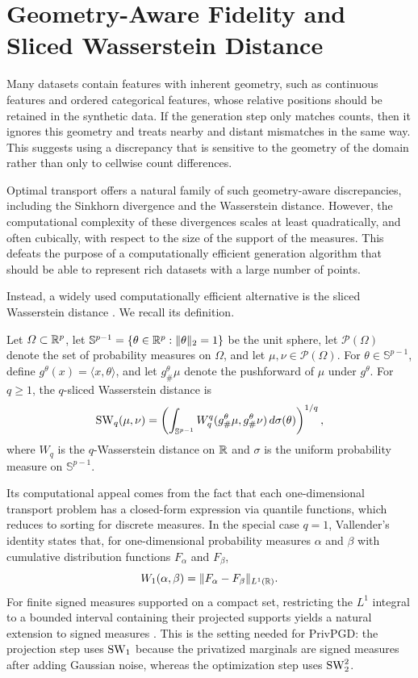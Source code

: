 \section{Geometry-Aware Fidelity and Sliced Wasserstein Distance}

Many datasets contain features with inherent geometry, such as continuous features and ordered categorical features, whose relative positions should be retained in the synthetic data. If the generation step only matches counts, then it ignores this geometry and treats nearby and distant mismatches in the same way. This suggests using a discrepancy that is sensitive to the geometry of the domain rather than only to cellwise count differences.

Optimal transport offers a natural family of such geometry-aware discrepancies, including the Sinkhorn divergence and the Wasserstein distance. However, the computational complexity of these divergences scales at least quadratically, and often cubically, with respect to the size of the support of the measures. This defeats the purpose of a computationally efficient generation algorithm that should be able to represent rich datasets with a large number of points.

Instead, a widely used computationally efficient alternative is the sliced Wasserstein distance \citep{bonneel2015sliced,wu2019sliced,kolouri2018sliced,deshpande2018generative,deshpande2019max}. We recall its definition.

\begin{definition}
Let \(\Omega \subset \mathbb{R}^p\), let \(\mathbb{S}^{p-1} = \{\theta \in \mathbb{R}^p : \|\theta\|_2 = 1\}\) be the unit sphere, let \(\mathcal{P}(\Omega)\) denote the set of probability measures on \(\Omega\), and let \(\mu,\nu \in \mathcal{P}(\Omega)\). For \(\theta \in \mathbb{S}^{p-1}\), define \(g^\theta(x)=\langle x,\theta\rangle\), and let \(g^\theta_{\#}\mu\) denote the pushforward of \(\mu\) under \(g^\theta\). For \(q \geq 1\), the \(q\)-sliced Wasserstein distance is
\[
  \operatorname{SW}_q(\mu,\nu)
  =
  \left(
    \int_{\mathbb{S}^{p-1}}
    W_q^q(g^\theta_{\#}\mu,g^\theta_{\#}\nu)\,d\sigma(\theta)
  \right)^{1/q},
\]
where \(W_q\) is the \(q\)-Wasserstein distance on \(\mathbb{R}\) and \(\sigma\) is the uniform probability measure on \(\mathbb{S}^{p-1}\).
\end{definition}

Its computational appeal comes from the fact that each one-dimensional transport problem has a closed-form expression via quantile functions, which reduces to sorting for discrete measures. In the special case \(q=1\), Vallender's identity states that, for one-dimensional probability measures \(\alpha\) and \(\beta\) with cumulative distribution functions \(F_\alpha\) and \(F_\beta\),
\[
  W_1(\alpha,\beta) = \|F_\alpha - F_\beta\|_{L^1(\mathbb{R})}.
\]
For finite signed measures supported on a compact set, restricting the \(L^1\) integral to a bounded interval containing their projected supports yields a natural extension to signed measures \citep{vallander,boedihardjo2022private}. This is the setting needed for PrivPGD: the projection step uses \(\operatorname{SW}_1\) because the privatized marginals are signed measures after adding Gaussian noise, whereas the optimization step uses \(\operatorname{SW}_2^2\).

